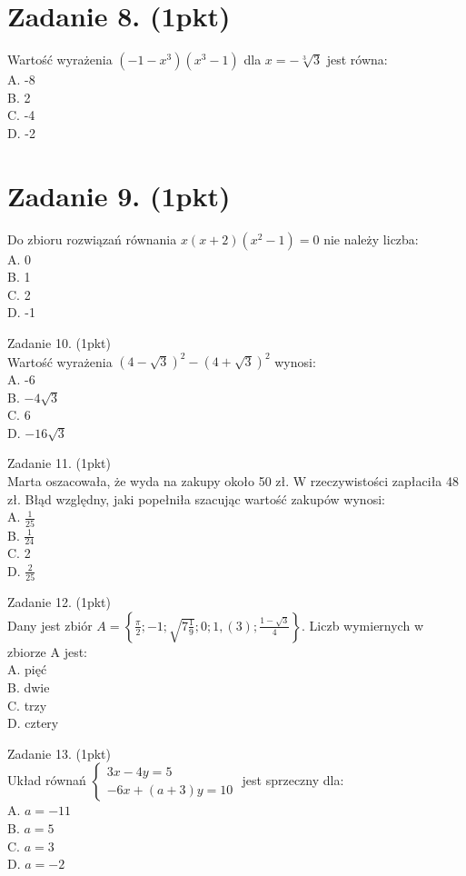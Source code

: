 \documentclass[10pt]{article}
\begin{document}
\section*{Zadanie 8. (1pkt)}
Wartość wyrażenia \(\left(-1-x^{3}\right)\left(x^{3}-1\right)\) dla \(x=-\sqrt[3]{3}\) jest równa:\\
A. -8\\
B. 2\\
C. -4\\
D. -2

\section*{Zadanie 9. (1pkt)}
Do zbioru rozwiązań równania \(x(x+2)\left(x^{2}-1\right)=0\) nie należy liczba:\\
A. 0\\
B. 1\\
C. 2\\
D. -1

Zadanie 10. (1pkt)\\
Wartość wyrażenia \((4-\sqrt{3})^{2}-(4+\sqrt{3})^{2}\) wynosi:\\
A. -6\\
B. \(-4 \sqrt{3}\)\\
C. 6\\
D. \(-16 \sqrt{3}\)

Zadanie 11. (1pkt)\\
Marta oszacowała, że wyda na zakupy około 50 zł. W rzeczywistości zapłaciła 48 zł. Błąd względny, jaki popełniła szacując wartość zakupów wynosi:\\
A. \(\frac{1}{25}\)\\
B. \(\frac{1}{24}\)\\
C. 2\\
D. \(\frac{2}{25}\)

Zadanie 12. (1pkt)\\
Dany jest zbiór \(A=\left\{\frac{\pi}{2} ;-1 ; \sqrt{7 \frac{1}{9}} ; 0 ; 1,(3) ; \frac{1-\sqrt{3}}{4}\right\}\). Liczb wymiernych w zbiorze A jest:\\
A. pięć\\
B. dwie\\
C. trzy\\
D. cztery

Zadanie 13. (1pkt)\\
Układ równań \(\left\{\begin{array}{c}3 x-4 y=5 \\ -6 x+(a+3) y=10\end{array}\right.\) jest sprzeczny dla:\\
A. \(a=-11\)\\
B. \(a=5\)\\
C. \(a=3\)\\
D. \(a=-2\)
\end{document}
